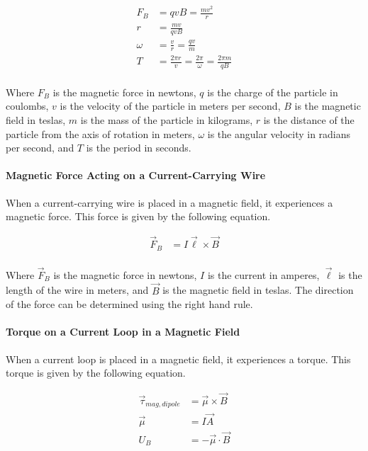 \begin{align*}
    F_B &= qvB = \frac{mv^2}{r}\\
    r &= \frac{mv}{qvB}\\
    \omega &= \frac{v}{r} = \frac{qv}{m}\\
    T &= \frac{2\pi r}{v} = \frac{2\pi}{\omega} = \frac{2\pi m}{qB}\\
\end{align*}

Where $F_B$ is the magnetic force in newtons, $q$ is the charge of the particle in coulombs, $v$ is the velocity of the 
particle in meters per second, $B$ is the magnetic field in teslas, $m$ is the mass of the particle in kilograms, $r$ is 
the distance of the particle from the axis of rotation in meters, $\omega$ is the angular velocity in radians per second, 
and $T$ is the period in seconds.\\

\paragraph*{Magnetic Force Acting on a Current-Carrying Wire}
When a current-carrying wire is placed in a magnetic field, it experiences a magnetic force. This force is given by the
following equation.

\begin{align*}
    \vec{F}_B &= I\vec{\ell} \times \vec{B}\\
\end{align*}

Where $\vec{F}_B$ is the magnetic force in newtons, $I$ is the current in amperes, $\vec{\ell}$ is the length of the wire in meters,
and $\vec{B}$ is the magnetic field in teslas. The direction of the force can be determined using the right hand rule.\\

\paragraph*{Torque on a Current Loop in a Magnetic Field}
When a current loop is placed in a magnetic field, it experiences a torque. This torque is given by the following equation.

\begin{align*}
    \vec{\tau}_{mag,dipole} &= \vec{\mu} \times \vec{B}\\
    \vec{\mu} &= I\vec{A}\\
    U_B &= -\vec{\mu} \cdot \vec{B}\\
\end{align*}

